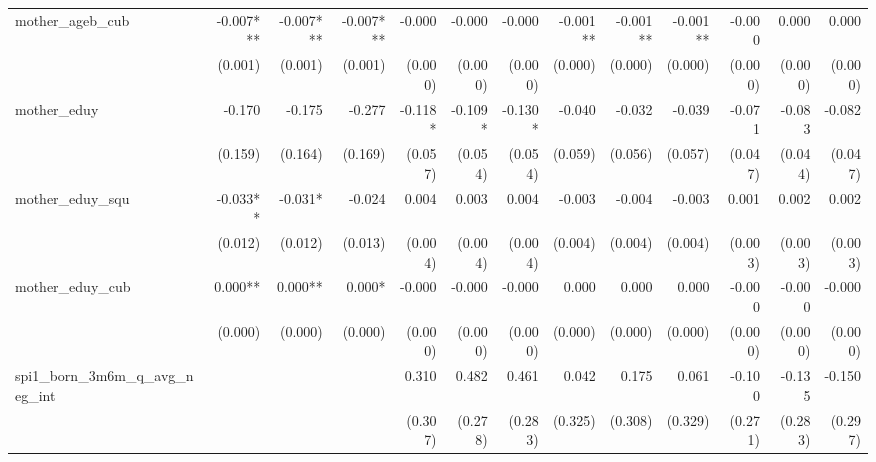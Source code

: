 \begin{tabular}{lrrrrrrrrrrrr}
mother\_ageb\_cub                           &    -0.007*** &    -0.007*** &    -0.007*** &       -0.000 &       -0.000 &       -0.000 &     -0.001** &     -0.001** &     -0.001** &       -0.000 &        0.000 &        0.000 \\ 
                                            &      (0.001) &      (0.001) &      (0.001) &      (0.000) &      (0.000) &      (0.000) &      (0.000) &      (0.000) &      (0.000) &      (0.000) &      (0.000) &      (0.000) \\ 
mother\_eduy                                &       -0.170 &       -0.175 &       -0.277 &      -0.118* &      -0.109* &      -0.130* &       -0.040 &       -0.032 &       -0.039 &       -0.071 &       -0.083 &       -0.082 \\ 
                                            &      (0.159) &      (0.164) &      (0.169) &      (0.057) &      (0.054) &      (0.054) &      (0.059) &      (0.056) &      (0.057) &      (0.047) &      (0.044) &      (0.047) \\ 
mother\_eduy\_squ                           &     -0.033** &      -0.031* &       -0.024 &        0.004 &        0.003 &        0.004 &       -0.003 &       -0.004 &       -0.003 &        0.001 &        0.002 &        0.002 \\ 
                                            &      (0.012) &      (0.012) &      (0.013) &      (0.004) &      (0.004) &      (0.004) &      (0.004) &      (0.004) &      (0.004) &      (0.003) &      (0.003) &      (0.003) \\ 
mother\_eduy\_cub                           &      0.000** &      0.000** &       0.000* &       -0.000 &       -0.000 &       -0.000 &        0.000 &        0.000 &        0.000 &       -0.000 &       -0.000 &       -0.000 \\ 
                                            &      (0.000) &      (0.000) &      (0.000) &      (0.000) &      (0.000) &      (0.000) &      (0.000) &      (0.000) &      (0.000) &      (0.000) &      (0.000) &      (0.000) \\ 
spi1\_born\_3m6m\_q\_avg\_neg\_int          &              &              &              &        0.310 &        0.482 &        0.461 &        0.042 &        0.175 &        0.061 &       -0.100 &       -0.135 &       -0.150 \\ 
                                            &              &              &              &      (0.307) &      (0.278) &      (0.283) &      (0.325) &      (0.308) &      (0.329) &      (0.271) &      (0.283) &      (0.297) \\ 

\end{tabular}
